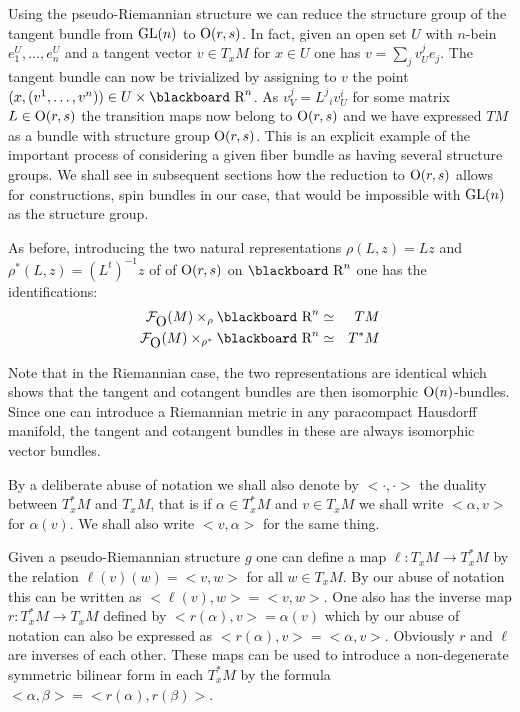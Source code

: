 \documentclass[12pt,titlepage]{article}
\def\bbf#1{\hbox{\blackboard #1}}
\def\lR{\bbf R}
\def\cF{{\cal F}}
\def\GL{\hbox{GL}}
\def\O{\hbox{O}}
\begin{document}
Using the pseudo-Riemannian structure we can reduce the structure group
of the tangent bundle from \(\GL(n)\) to \(\O(r,s)\). In fact, given an
open set \(U\) with \(n\)-bein \(e^U_1,\dots,e^U_n\) and a tangent
vector \(v\in T_xM\) for \(x\in U\) one has \(v = \sum_jv^j_Ue_j\). The
tangent bundle can now be trivialized by assigning to \(v\) the point
\((x, (v^1,\dots,v^n))\in U\times\lR^n\). As  \(v^j_V = L^j{}_iv^i_U\)
for some matrix \(L\in \O(r,s)\) the transition maps now belong to
\(\O(r,s)\) and we have expressed \(TM\) as a bundle with structure group
\(\O(r,s)\). This is an explicit example of the important process of
considering a given fiber bundle as having several structure groups.
We shall see  in subsequent sections how the reduction to \(\O(r,s)\)
allows for constructions, spin bundles in our case,
 that would be impossible with \(\GL(n)\) as the
structure group.

As before, introducing the two natural representations
\(\rho(L,z) = Lz\) and \(\rho^*(L,z) = (L^t)^{-1}z\)  of
of \(\O(r,s)\) on \(\lR^n\)
one  has the identifications:
\begin{eqnarray}\label{eq:fotm}
\cF_{\O}(M)\times_\rho {\lR}^n  &\simeq &  TM \\ \label{eq:focotm}
\cF_{\O}(M)\times_{\rho^*} {\lR}^n &\simeq &  T^*M
\end{eqnarray}%

Note that in the Riemannian case, the two
representations are identical which shows that the tangent and cotangent
bundles are then isomorphic \(\O(n)\)-bundles. Since one can introduce a 
Riemannian metric in any paracompact Hausdorff manifold, 
the tangent and cotangent bundles in these are always isomorphic 
vector bundles.

By a deliberate abuse of notation we shall also denote by
\(<\cdot,\cdot>\) the duality between \(T^*_xM \) and \(T_xM\), that is
if \(\alpha\in T^*_xM\) and \(v\in T_xM\) we shall write \(<\alpha,v>\)
for \(\alpha(v)\). We shall also write \(<v,\alpha>\) for the same
thing.

Given a pseudo-Riemannian structure \(g\) one can define a map
\(\ell:T_xM \to T^*_xM\)
% 
by the relation \(\ell(v)(w) = <v,w>\) for all
\(w\in T_xM\). By our abuse of notation this can be written as
\(<\ell(v), w> = <v,w>\). One also has the inverse map \(r:T^*_xM \to
T_xM\)
% 
defined by \(<r(\alpha),v> = \alpha(v)\) 
which by our abuse of
notation can also be expressed as \(<r(\alpha),v> = <\alpha,v>\).
Obviously \(r\) and \(\ell\) are inverses of each other. These maps can
be used to introduce a non-degenerate symmetric bilinear form in
each \(T^*_xM\) by the formula \(<\alpha,\beta> = <r(\alpha),r(\beta)>\).
\end{document}
